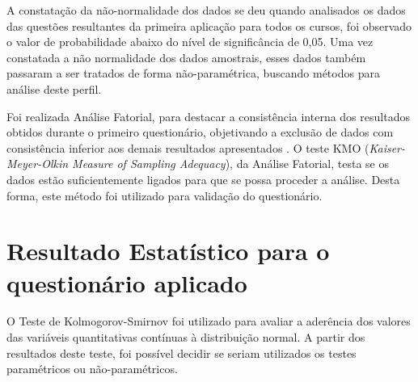 A constatação da não-normalidade dos dados se deu quando
analisados os dados das questões resultantes da primeira aplicação para todos os cursos, foi observado o valor de probabilidade abaixo do nível de significância de 0,05. Uma vez constatada a não normalidade dos dados amostrais, esses dados também passaram a ser tratados de forma não-paramétrica, buscando métodos para análise deste perfil. 


Foi realizada Análise Fatorial, para destacar a consistência interna dos resultados obtidos durante o primeiro questionário, objetivando a exclusão de dados com consistência inferior aos demais resultados apresentados . O teste
KMO (\textit{Kaiser-Meyer-Olkin Measure of Sampling Adequacy}), da Análise Fatorial, testa se os dados estão suficientemente ligados para que se possa proceder a análise. Desta forma, este método foi utilizado para validação do questionário.


\section{Resultado Estatístico para o questionário aplicado}

O Teste de Kolmogorov-Smirnov foi utilizado para avaliar a aderência dos valores das variáveis quantitativas contínuas à  distribuição  normal.  A  partir  dos  resultados  deste  teste,  foi  possível  decidir  se  seriam  utilizados  os  testes  paramétricos  ou  não-paramétricos.  








